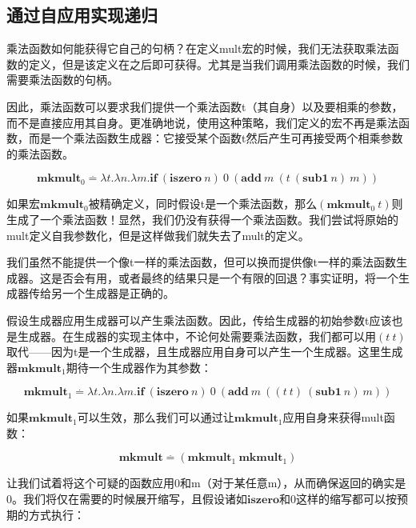 \documentclass{book}
\begin{document}
\subsection{通过自应用实现递归}
乘法函数如何能获得它自己的句柄？在定义mult宏的时候，我们无法获取乘法函数的定义，但是该定义在之后即可获得。尤其是当我们调用乘法函数的时候，我们需要乘法函数的句柄。\par
因此，乘法函数可以要求我们提供一个乘法函数t（其自身）以及要相乘的参数，而不是直接应用其自身。更准确地说，使用这种策略，我们定义的宏不再是乘法函数，而是一个乘法函数生成器：它接受某个函数t然后产生可再接受两个相乘参数的乘法函数。
\begin{framed}
 $$
 \mathbf{mkmult}_0\stackrel{.}{=}\lambda t.\lambda n.\lambda m.\mathbf{if}\ (\mathbf{iszero}\ n)\ 0\ (\mathbf{add}\ m\ (t\ (\mathbf{sub1}\ n)\ m))
 $$
\end{framed}
如果宏$\mathbf{mkmult}_0$被精确定义，同时假设t是一个乘法函数，那么$(\mathbf{mkmult}_0\ t)$则生成了一个乘法函数！显然，我们仍没有获得一个乘法函数。我们尝试将原始的mult定义自我参数化，但是这样做我们就失去了mult的定义。\par
我们虽然不能提供一个像t一样的乘法函数，但可以换而提供像t一样的乘法函数生成器。这是否会有用，或者最终的结果只是一个有限的回退？事实证明，将一个生成器传给另一个生成器是正确的。\par
假设生成器应用生成器可以产生乘法函数。因此，传给生成器的初始参数t应该也是生成器。在生成器的实现主体中，不论何处需要乘法函数，我们都可以用$(t\  t)$取代——因为t是一个生成器，且生成器应用自身可以产生一个生成器。这里生成器$\mathbf{mkmult}_1$期待一个生成器作为其参数：
\begin{framed}
 $$
 \mathbf{mkmult}_1\stackrel{.}{=}\lambda t.\lambda n.\lambda m.\mathbf{if}\ (\mathbf{iszero}\ n)\ 0\ (\mathbf{add}\ m\ ((t\ t)\ (\mathbf{sub1}\ n)\ m))
 $$
\end{framed}
如果$\mathbf{mkmult}_1$可以生效，那么我们可以通过让$\mathbf{mkmult}_1$应用自身来获得mult函数：
\begin{framed}
 $$
 \mathbf{mkmult}\stackrel{.}{=}(\mathbf{mkmult}_1\ \mathbf{mkmult}_1)
 $$
\end{framed}
让我们试着将这个可疑的函数应用0和m（对于某任意m），从而确保返回的确实是0。我们将仅在需要的时候展开缩写，且假设诸如$\mathbf{iszero}$和0这样的缩写都可以按预期的方式执行：
\end{document}
